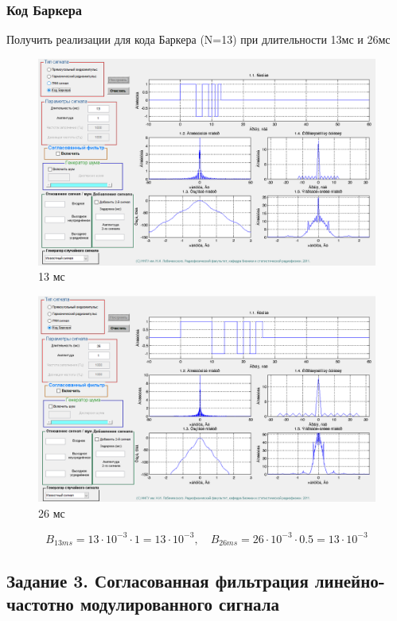 \subsubsection{Код Баркера}
Получить реализации для кода Баркера (N=13) при длительности 13мс и
26мс
\begin{figure}[H]
    \centering
    \includegraphics[width=0.9\linewidth]{imgs/t1s4_13.png}
    \caption{13 мс}
    \label{fig:task4_13}
\end{figure}
\begin{figure}[H]
    \centering
    \includegraphics[width=0.9\linewidth]{imgs/t1s4_26.png}
    \caption{26 мс}
    \label{fig:task4_26}
\end{figure}

\begin{equation}
    B_{13ms} = 13 \cdot 10^{-3} \cdot 1 = 13 \cdot 10^{-3}, \quad B_{26ms} = 26 \cdot 10^{-3} \cdot 0.5 = 13 \cdot 10^{-3}
    \label{eq:}
\end{equation}



\subsection{Задание 3. Согласованная фильтрация линейно-частотно
модулированного сигнала}

